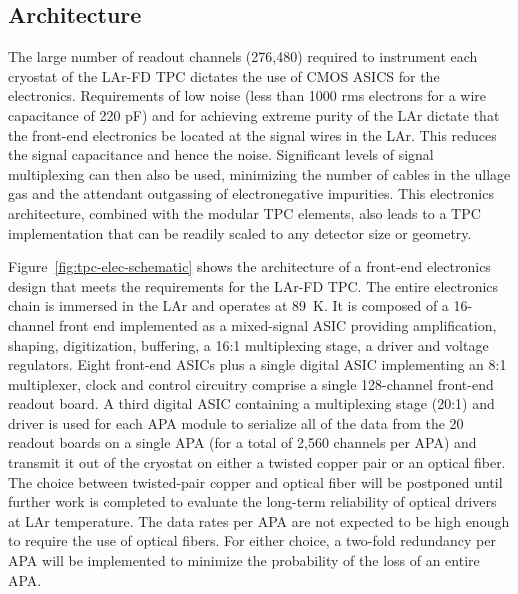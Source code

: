 \subsection{Architecture}
\label{subsec:fe-arch}

The large number of readout channels (276,480) required to instrument
each cryostat of the LAr-FD TPC dictates the use of CMOS ASICS for the electronics. 
Requirements of low noise (less than 1000 rms electrons for a wire
capacitance of 220 pF) and for achieving extreme purity of the LAr dictate that
the front-end electronics be located at the signal wires in the LAr.  This
reduces the signal capacitance and hence the noise. Significant levels of 
signal multiplexing can then also be used, minimizing the number of cables
in the ullage gas and the attendant 
outgassing of electronegative impurities.
This electronics
architecture, combined with the modular TPC elements, also leads to a
TPC implementation that can be readily scaled to any detector size or
geometry.

Figure~\ref{fig:tpc-elec-schematic} shows the architecture of a front-end electronics
design that meets the requirements for the LAr-FD TPC. The entire
electronics chain is immersed in the LAr and operates at
89~K. It is composed of a 16-channel front end implemented as a
mixed-signal ASIC providing amplification, shaping, digitization,
buffering, a 16:1 multiplexing stage, a driver and voltage regulators.
Eight front-end ASICs plus a single digital ASIC implementing an
8:1 multiplexer, clock and control circuitry comprise a 
single 128-channel front-end readout board.  A third digital ASIC containing a
multiplexing stage (20:1) and driver is used for each APA module to serialize all of the data
from the 20 readout boards on a single APA (for a total of 2,560 channels per APA) and
transmit it out of the cryostat on either a twisted copper pair or an
optical fiber. The choice between twisted-pair copper and optical fiber will be
postponed until further work is completed to evaluate the long-term reliability
of optical drivers at LAr temperature. The data rates per APA
are not expected to be high enough to require the use of optical fibers.
For either choice, a two-fold redundancy per APA will be implemented
to minimize the probability of the loss of an entire APA.


